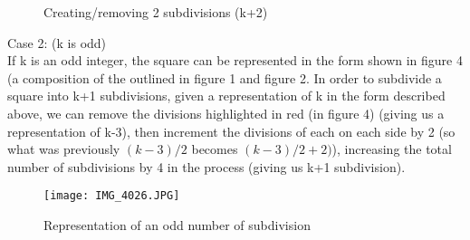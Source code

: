 \documentclass[solution,letterpaper]{cs20}
\begin{document}
\begin{problem}
\begin{solution}
            \begin{figure}[H]
                \centering
                \caption{Creating/removing 2 subdivisions (k+2)}
            \end{figure}

            Case 2: (k is odd) \\
            If k is an odd integer, the square can be represented in the form shown in figure 4 (a composition of the outlined in figure 1 and figure 2.
            In order to subdivide a square into k+1 subdivisions, given a representation of k in the form described above, we can remove the divisions highlighted in red (in figure 4) (giving us a representation of k-3), then increment the divisions of each on each side by 2 (so what was previously $(k-3)/2$ becomes $(k-3)/2 + 2)$), increasing the total number of subdivisions by 4 in the process (giving us k+1 subdivision). \\


            \begin{figure}[H]
                \centering
                \texttt{[image: IMG\_4026.JPG]}
                \caption{Representation of an odd number of subdivision}
                \label{fig:enter-label}
            \end{figure}


\end{solution}
\end{problem}
\end{document}
